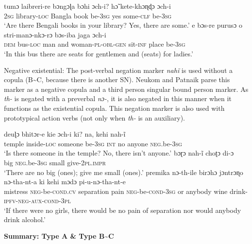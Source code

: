 ﻿\documentclass[output=paper]{langsci/langscibook}
\begin{document}
\begin{unindented}
\begin{exe}
\ex \gll tumɔ laibreri-re bɔngɔɭa bɔhi  ɔch-i? hɔ̃ kete-khɔɳɖɔ ɔch-i \\
\textsc{2sg} library-\textsc{loc} Bangla book be-\textsc{3sg} yes some-\textsc{clf} be-\textsc{3sg} \\
    \glt `Are there Bengali books in your library? Yes, there are some.'
\parencite[118]{NeukomPatnaik2003}
\ex \gll e bɔs-re purusɔ o stri-manɔ-nkɔ-rɔ bɔs-iba jaga  ɔch-i \\
\textsc{dem} bus-\textsc{loc} man and woman-\textsc{pl-obl-gen} sit-\textsc{inf} place be-\textsc{3sg} \\
\glt `In this bus there are seats for gentlemen and (seats) for ladies.'
\parencite[38]{NeukomPatnaik2003}
    \end{exe}

Negative existential: The post-verbal negation marker \textit{nahĩ} is used without a copula (B{\textasciitilde}C, because there is another SN). Neukom and Patnaik parse this marker as a negative copula and a third person singular bound person marker. As \textit{th-} is negated with a preverbal \textit{nɔ-}, it is also negated in this manner when it functions as the existential copula. This negation marker is also used with prototypical action verbs (not only when \textit{th-} is an auxiliary). 
%
\begin{exe}\ex \gll deuɭɔ bhitɔr-e kie ɔch-i ki? na, kehi nah-ĩ \\
temple inside-\textsc{loc}   someone be-\textsc{3sg}   \textsc{int}      no  anyone \textsc{neg}.be-\textsc{3sg} \\
    \glt `Is there someone in the temple? No, there isn't anyone.'
\parencite[100]{NeukomPatnaik2003}
\ex \gll bɔɽɔ nah-ĩ choʈɔ di-ɔ \\
big \textsc{neg}.be-\textsc{3sg} small give-\textsc{2pl.impr} \\
    \glt `There are no big (ones); give me small (ones).' \parencite[72]{NeukomPatnaik2003} 
\ex \gll premika nɔ-th-ile birɔhɔ jɔntrɔɳo nɔ-tha-nt-a ki kehi mɔdɔ pi-u-nɔ-tha-nt-e \\
mistress \textsc{neg}-be-\textsc{cond}.\textsc{cv}   separation pain        \textsc{neg}-be-\textsc{cond}-\textsc{3sg} or anybody wine drink-\textsc{ipfv-neg-aux-cond-3pl} \\
    \glt `If there were no girls, there would be no pain of separation nor
would anybody drink alcohol.' \parencite[195]{NeukomPatnaik2003}
\end{exe}

\textbf{Summary: Type A \& Type B{\textasciitilde}C} 


\end{unindented}
\end{document}
